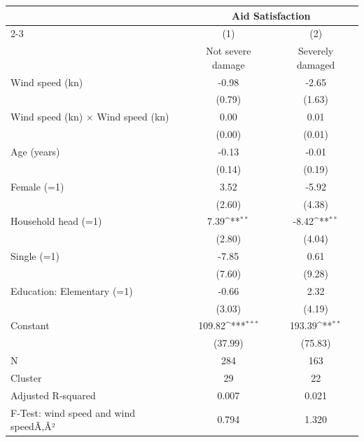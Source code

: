 {
\def\sym#1{\ifmmode^{#1}\else\(^{#1}\)\fi}
\begin{tabular}{l*{2}{c}}
\toprule
                    &\multicolumn{2}{c}{Aid Satisfaction}       \\\cmidrule(lr){2-3}
                    &\multicolumn{1}{c}{(1)}&\multicolumn{1}{c}{(2)}\\
                    &\multicolumn{1}{c}{Not severe damage}&\multicolumn{1}{c}{Severely damaged}\\
\midrule
Wind speed (kn)     &       -0.98         &       -2.65         \\
                    &      (0.79)         &      (1.63)         \\
Wind speed (kn) $\times$ Wind speed (kn)&        0.00         &        0.01         \\
                    &      (0.00)         &      (0.01)         \\
Age (years)         &       -0.13         &       -0.01         \\
                    &      (0.14)         &      (0.19)         \\
Female (=1)         &        3.52         &       -5.92         \\
                    &      (2.60)         &      (4.38)         \\
Household head (=1) &        7.39\sym{**} &       -8.42\sym{**} \\
                    &      (2.80)         &      (4.04)         \\
Single (=1)         &       -7.85         &        0.61         \\
                    &      (7.60)         &      (9.28)         \\
Education: Elementary (=1)&       -0.66         &        2.32         \\
                    &      (3.03)         &      (4.19)         \\
Constant            &      109.82\sym{***}&      193.39\sym{**} \\
                    &     (37.99)         &     (75.83)         \\
\midrule
N                   &         284         &         163         \\
Cluster             &          29         &          22         \\
Adjusted R-squared  &       0.007         &       0.021         \\
F-Test: wind speed and wind speedÃ‚Â²&       0.794         &       1.320         \\
\bottomrule
\end{tabular}
}
